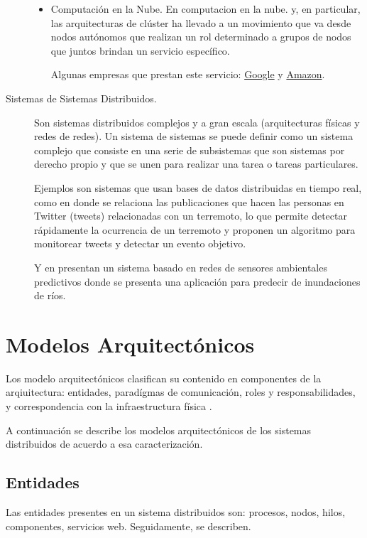 \begin{description}
\begin{itemize}
		\item Computación en la Nube. En \gls{computacion en la nube}. y, en particular, las arquitecturas de clúster ha llevado a un movimiento que va  desde nodos autónomos que realizan un rol determinado a grupos de nodos que juntos brindan un servicio específico. 
		
		Algunas empresas que prestan este servicio: \href{https://cloud.google.com/}{Google}  y 				\href{https://aws.amazon.com/es/}{Amazon}.
	
	\end{itemize}

	\item[Sistemas de Sistemas Distribuidos.] Son  sistemas distribuidos complejos y a gran escala (arquitecturas físicas y redes de redes). Un sistema de sistemas se puede definir como un sistema complejo que consiste en una serie de subsistemas que son sistemas por derecho propio y que se unen para realizar una tarea o tareas particulares. 

	Ejemplos son sistemas que usan bases de datos distribuidas en tiempo real, como en  donde se relaciona  las publicaciones que hacen  las personas en Twitter (tweets) relacionadas con un terremoto, lo que permite detectar rápidamente la ocurrencia de un terremoto y proponen un algoritmo para monitorear tweets y detectar un evento objetivo.  
	
	Y en  presentan un sistema basado en  redes de sensores ambientales predictivos donde se presenta una aplicación para predecir de inundaciones de ríos.	
\end{description}

\section{Modelos Arquitect\'onicos }
\label{sec:mod-arquitec}

Los modelo arquitectónicos clasifican su contenido en componentes de la arqiuitectura: entidades, paradígmas de comunicación, roles y responsabilidades, y correspondencia con la infraestructura física .

A  continuación se describe los modelos arquitect\'onicos de los sistemas distribuidos de acuerdo a esa caracterización.

\subsection {Entidades}
\label{subsec:entidades}
Las entidades presentes en un sistema distribuidos son: procesos, nodos, hilos, componentes, servicios web. Seguidamente, se describen.

